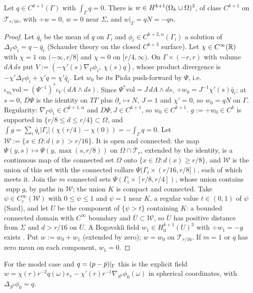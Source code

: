 \begin{lemma}\label{er:w}
Let $q\in C^{k+1}(\Gamma)$ with $\int_\Gamma q=0$. There is $w\in H^{k+1}(\Omega_h\cup\Omega)^3$, of class $C^{k+1}$ on $\mathcal T_{r/16}$, with $\div w=0$, $w=0$ near $\Sigma$, and $w|_\Gamma=qN=-qn$.
\end{lemma}

\begin{proof}
Let $\bar q_i$ be the mean of $q$ on $\Gamma_i$ and $\phi_i\in C^{k+2,\alpha}(\Gamma_i)$ a solution of $\Delta_\Gamma\phi_i=q-\bar q_i$ (Schauder theory on the closed $C^{k+3}$ surface). Let $\chi\in C^\infty(\mathbb R)$ with $\chi=1$ on $(-\infty,r/8]$ and $\chi=0$ on $[r/4,\infty)$. On $\Gamma\times(-r,r)$ with volume $dA\,ds$ put $V:=(-\chi'(s)\nabla_\Gamma\phi_i,\ \chi(s)q)$, whose product divergence is $-\chi'\Delta_\Gamma\phi_i+\chi'q=\chi'\bar q_i$. Let $w_0$ be its Piola push-forward by $\Psi$, i.e.\ $\iota_{w_0}\mathrm{vol}=(\Psi^{-1})^\ast\iota_V(dA\wedge ds)$. Since $\Psi^\ast\mathrm{vol}=J\,dA\wedge ds$, $\div w_0=J^{-1}\chi'(s)\bar q_i$; at $s=0$, $D\Psi$ is the identity on $T\Gamma$ plus $\partial_s\mapsto N$, $J=1$ and $\chi'=0$, so $w_0=qN$ on $\Gamma$. Regularity: $\nabla_\Gamma\phi_i\in C^{k+1,\alpha}$ and $D\Psi,J\in C^{k+1}$, so $w_0\in C^{k+1}$.
$g:=\div w_0\in C^k$ is supported in $\{r/8\le d\le r/4\}\subset\Omega$, and $\int g=\sum_i\bar q_i|\Gamma_i|(\chi(r/4)-\chi(0))=-\int_\Gamma q=0$. Let $\mathcal W:=\{x\in\Omega:d(x)>r/16\}$. It is open and connected: the map $\Psi(y,s)\mapsto\Psi(y,\max(s,r/8))$ on $\Omega\cap\mathcal T_r$, extended by the identity, is a continuous map of the connected set $\Omega$ onto $\{x\in\Omega:d(x)\ge r/8\}$, and $\mathcal W$ is the union of this set with the connected collars $\Psi(\Gamma_i\times(r/16,r/8])$, each of which meets it. Join the $m$ connected sets $\Psi(\Gamma_i\times[r/8,r/4])$, whose union contains $\operatorname{supp}g$, by paths in $\mathcal W$; the union $K$ is compact and connected. Take $\psi\in C^\infty_c(\mathcal W)$ with $0\le\psi\le1$ and $\psi=1$ near $K$, a regular value $t\in(0,1)$ of $\psi$ (Sard), and let $U$ be the component of $\{\psi>t\}$ containing $K$: a bounded connected domain with $C^\infty$ boundary and $\overline U\subset\mathcal W$, so $\overline U$ has positive distance from $\Sigma$ and $d>r/16$ on $\overline U$. A Bogovski\u{\i} field $w_1\in H^{k+1}_0(U)^3$ with $\div w_1=-g$ exists \cite{CostabelMcIntosh2010,Galdi}. Put $w:=w_0+w_1$ (extended by zero); $w=w_0$ on $\mathcal T_{r/16}$. If $m=1$ or $q$ has zero mean on each component, $w_1=0$. %
\end{proof}
For the model case and $q=(p-\bar p)|_\Gamma$ this is the explicit field $w=\chi(r)r^{-2}q(\omega)e_r-\chi'(r)r^{-1}\nabla_{S^2}\phi_0(\omega)$ in spherical coordinates, with $\Delta_{S^2}\phi_0=q$.

